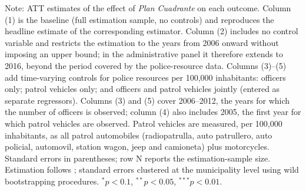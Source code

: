 \begin{table}[h!]
{\begin{threeparttable}
\begin{tabular}{l ccccc}
\bottomrule
\end{tabular}
\begin{tablenotes}[flushleft]
\item \footnotesize{Note: ATT estimates of the effect of \emph{Plan Cuadrante} on each outcome. Column (1) is the baseline (full estimation sample, no controls) and reproduces the headline estimate of the corresponding estimator. Column (2) includes no control variable and restricts the estimation to the years from 2006 onward without imposing an upper bound; in the administrative panel it therefore extends to 2016, beyond the period covered by the police-resource data. Columns (3)--(5) add time-varying controls for police resources per 100{,}000 inhabitants: officers only; patrol vehicles only; and officers and patrol vehicles jointly (entered as separate regressors). Columns (3) and (5) cover 2006--2012, the years for which the number of officers is observed; column (4) also includes 2005, the first year for which patrol vehicles are observed. Patrol vehicles are measured, per 100{,}000 inhabitants, as all patrol automobiles (radiopatrulla, auto patrullero, auto policial, automovil, station wagon, jeep and camioneta) plus motorcycles. Standard errors in parentheses; row N reports the estimation-sample size. Estimation follows \citet{Callaway}; standard errors clustered at the municipality level using wild bootstrapping procedures. $^{*}p<0.1$, $^{**}p<0.05$, $^{***}p<0.01$.}
\end{tablenotes}
\end{threeparttable}}
\end{table}
